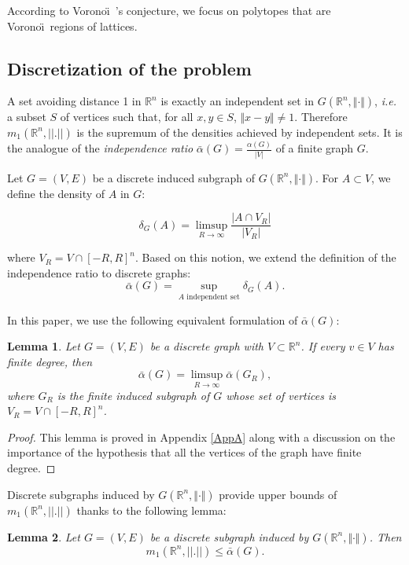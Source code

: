 \documentclass{amsart}                     %
\newtheorem{lemm}{Lemma}
\newcommand{\R}{{\mathbb R}}
\begin{document}
According to Vorono\"\i\ 's conjecture, we focus on polytopes that are Vorono\"\i\  regions of lattices.


\subsection{Discretization of the problem}\label{prelimGraph}

A set avoiding distance 1 in $\R^n$ is exactly an independent set in $G(\R^n,\Vert \cdot \Vert)$, \textit{i.e.} a subset $S$ of vertices such that, for all $x,y\in S$, $\Vert x-y \Vert\neq 1$. Therefore $m_1(\R^n,||.||)$ is the supremum of the densities achieved by independent sets. It is the analogue of the \textit{independence ratio} $\bar{\alpha}(G)=\frac{\alpha(G)}{|V|}$ of a finite graph $G$. 

Let $G=(V,E)$ be a discrete induced subgraph of $G(\R^n,\Vert \cdot \Vert)$. For $A\subset V$, we define the density of $A$ in $G$:

\begin{equation}
\delta_G(A)=\limsup_{R\to \infty} \frac{|A\cap V_R|}{|V_R|} \label{DeltaG} 
\end{equation}
 
where $V_R=V\cap [-R,R]^n$. Based on this notion, we extend the definition of the independence ratio to discrete graphs:
$$ \bar{\alpha}(G)=\sup_{A \text{ independent set}} \delta_G(A). $$ 

In this paper, we use the following equivalent formulation of $\bar{\alpha}(G)$:

\begin{lemm}\label{alpha1=alpha2}
Let $G=(V,E)$ be a discrete graph with $V\subset \R^n$. If every $v\in V$ has finite degree, then
$$ \bar{\alpha}(G)=\limsup_{R\to \infty} \bar{\alpha}(G_R),$$
where $G_R$ is the finite induced subgraph of $G$ whose set of vertices is $V_R=V\cap [-R,R]^n$.
\end{lemm}

\begin{proof}
 This lemma is proved in Appendix \ref{AppA} along with a discussion on the importance of the hypothesis that all the vertices of the graph have finite degree.
\end{proof}


Discrete subgraphs induced by $G(\R^n,\Vert \cdot \Vert)$  provide upper bounds of $m_1(\R^n,||.||)$ thanks to the following lemma:

\begin{lemm}\label{LemmeSousGraphe}
Let $G=(V,E)$ be a discrete subgraph induced by $G(\R^n,\Vert \cdot \Vert)$. Then 
\[m_1(\R^n,||.||)\leq \bar{\alpha}(G).\]
\end{lemm}
\end{document}
